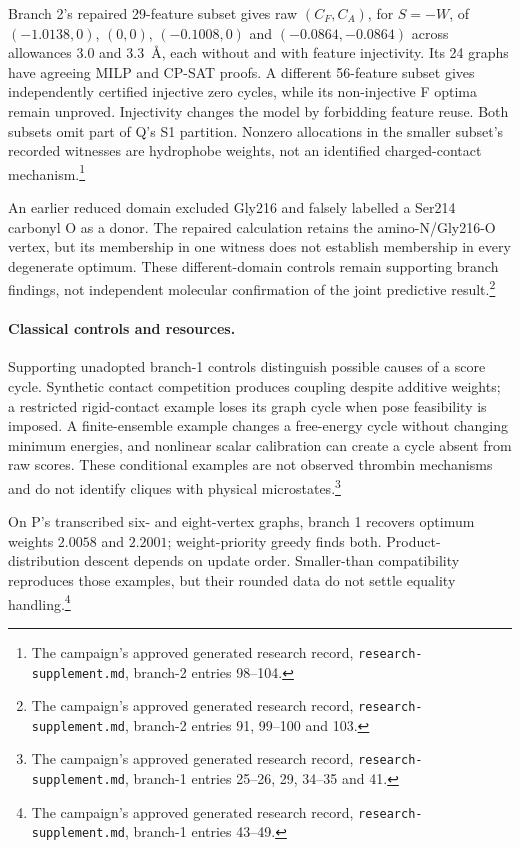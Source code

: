 \documentclass{article}
\newcommand{\rr}[1]{\footnote{The campaign's approved generated research record, \texttt{research-supplement.md}, #1.}}
\begin{document}
Branch 2's repaired 29-feature subset gives raw \((C_F,C_A)\), for \(S=-W\), of \((-1.0138,0)\), \((0,0)\), \((-0.1008,0)\) and \((-0.0864,-0.0864)\) across allowances 3.0 and 3.3~\AA, each without and with feature injectivity. Its 24 graphs have agreeing MILP and CP-SAT proofs. A different 56-feature subset gives independently certified injective zero cycles, while its non-injective F optima remain unproved. Injectivity changes the model by forbidding feature reuse. Both subsets omit part of Q's S1 partition. Nonzero allocations in the smaller subset's recorded witnesses are hydrophobe weights, not an identified charged-contact mechanism.\rr{branch-2 entries 98--104}

An earlier reduced domain excluded Gly216 and falsely labelled a Ser214 carbonyl O as a donor. The repaired calculation retains the amino-N/Gly216-O vertex, but its membership in one witness does not establish membership in every degenerate optimum. These different-domain controls remain supporting branch findings, not independent molecular confirmation of the joint predictive result.\rr{branch-2 entries 91, 99--100 and 103}

\paragraph{Classical controls and resources.}
Supporting unadopted branch-1 controls distinguish possible causes of a score cycle. Synthetic contact competition produces coupling despite additive weights; a restricted rigid-contact example loses its graph cycle when pose feasibility is imposed. A finite-ensemble example changes a free-energy cycle without changing minimum energies, and nonlinear scalar calibration can create a cycle absent from raw scores. These conditional examples are not observed thrombin mechanisms and do not identify cliques with physical microstates.\rr{branch-1 entries 25--26, 29, 34--35 and 41}

On P's transcribed six- and eight-vertex graphs, branch 1 recovers optimum weights \(2.0058\) and \(2.2001\); weight-priority greedy finds both. Product-distribution descent depends on update order. Smaller-than compatibility reproduces those examples, but their rounded data do not settle equality handling.\rr{branch-1 entries 43--49}
\end{document}
